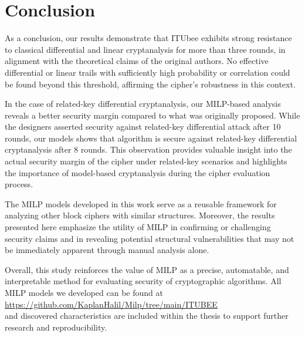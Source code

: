 \section{Conclusion}
As a conclusion, our results demonstrate that ITUbee exhibits strong resistance to classical differential and linear cryptanalysis for more than three rounds, in alignment with the theoretical claims of the original authors. No effective differential or linear trails with sufficiently high probability or correlation could be found beyond this threshold, affirming the cipher’s robustness in this context.

In the case of related-key differential cryptanalysis, our MILP-based analysis reveals a better security margin compared to what was originally proposed. While the designers asserted security against related-key differential attack after 10 rounds, our models shows that algorithm is secure against related-key differential cryptanalysis after 8 rounds. This observation provides valuable insight into the actual security margin of the cipher under related-key scenarios and highlights the importance of model-based cryptanalysis during the cipher evaluation process.

The MILP models developed in this work serve as a reusable framework for analyzing other block ciphers with similar structures. Moreover, the results presented here emphasize the utility of MILP in confirming or challenging security claims and in revealing potential structural vulnerabilities that may not be immediately apparent through manual analysis alone.

Overall, this study reinforces the value of MILP as a precise, automatable, and interpretable method for evaluating security of  cryptographic algorithms. All MILP models we developed can be found at \\
\url{https://github.com/KaplanHalil/Milp/tree/main/ITUBEE} \\
and discovered characteristics are included within the thesis  to support further research and reproducibility.